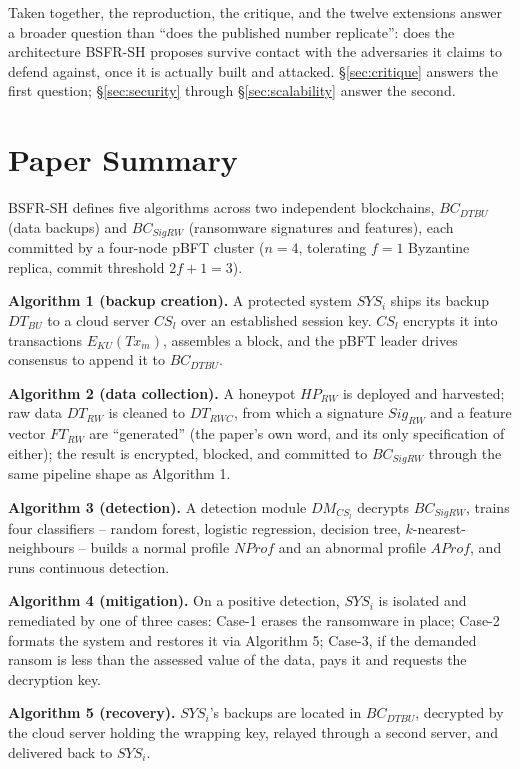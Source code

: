 \documentclass[conference]{IEEEtran}
\begin{document}
Taken together, the reproduction, the critique, and the twelve extensions answer a broader
question than ``does the published number replicate'': does the architecture BSFR-SH proposes
survive contact with the adversaries it claims to defend against, once it is actually built and
attacked. \S\ref{sec:critique} answers the first question; \S\ref{sec:security} through
\S\ref{sec:scalability} answer the second.
\section{Paper Summary}

BSFR-SH defines five algorithms across two independent blockchains, $BC_{DTBU}$ (data backups)
and $BC_{SigRW}$ (ransomware signatures and features), each committed by a four-node pBFT
\cite{castro-liskov} cluster ($n=4$, tolerating $f=1$ Byzantine replica, commit threshold
$2f+1=3$).

\textbf{Algorithm 1 (backup creation).} A protected system $SYS_i$ ships its backup $DT_{BU}$ to
a cloud server $CS_l$ over an established session key. $CS_l$ encrypts it into transactions
$E_{KU}(Tx_m)$, assembles a block, and the pBFT leader drives consensus to append it to
$BC_{DTBU}$.

\textbf{Algorithm 2 (data collection).} A honeypot $HP_{RW}$ is deployed and harvested; raw data
$DT_{RW}$ is cleaned to $DT_{RWC}$, from which a signature $Sig_{RW}$ and a feature vector
$FT_{RW}$ are ``generated'' (the paper's own word, and its only specification of either); the
result is encrypted, blocked, and committed to $BC_{SigRW}$ through the same pipeline shape as
Algorithm 1.

\textbf{Algorithm 3 (detection).} A detection module $DM_{CS_l}$ decrypts $BC_{SigRW}$, trains
four classifiers -- random forest, logistic regression, decision tree, $k$-nearest-neighbours --
builds a normal profile $NProf$ and an abnormal profile $AProf$, and runs continuous detection.

\textbf{Algorithm 4 (mitigation).} On a positive detection, $SYS_i$ is isolated and remediated
by one of three cases: Case-1 erases the ransomware in place; Case-2 formats the system and
restores it via Algorithm 5; Case-3, if the demanded ransom is less than the assessed value of
the data, pays it and requests the decryption key.

\textbf{Algorithm 5 (recovery).} $SYS_i$'s backups are located in $BC_{DTBU}$, decrypted by the
cloud server holding the wrapping key, relayed through a second server, and delivered back to
$SYS_i$.
\end{document}
